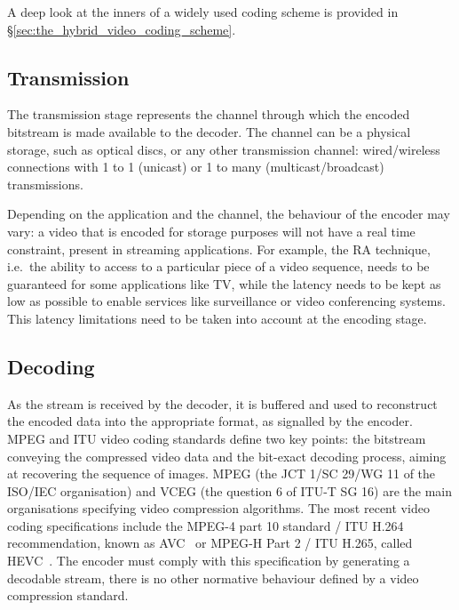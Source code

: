 \documentclass[11pt,a4paper,openright,twoside]{book}
\numberwithin{equation}{section} %
\numberwithin{figure}{section} %
\numberwithin{table}{section} %
\begin{document}
A deep look at the inners of a widely used coding scheme is provided
in \S\ref{sec:the_hybrid_video_coding_scheme}.

\subsection{Transmission}
\label{sub:transmission}

The transmission stage represents the channel through which the encoded
bitstream is made available to the decoder.
The channel can be a physical storage, such as optical discs, or any other
transmission channel: wired/wireless connections with 1 to 1 (unicast) or 1 to
many (multicast/broadcast) transmissions.

Depending on the application and the channel, the behaviour of the encoder may
vary:
a video that is encoded for storage purposes will not have a real time
constraint, present in streaming applications.
For example, the \ac{RA} technique, i.e.\ the ability to access to a
particular piece of a video sequence, needs to be guaranteed for some
applications like TV, while the latency needs to be kept as low as possible to
enable services like surveillance or video conferencing systems.
This latency limitations need to be taken into account at the encoding stage.

\subsection{Decoding}
\label{sub:decoding}

As the stream is received by the decoder, it is buffered and used to
reconstruct the encoded data into the appropriate format, as signalled
by the encoder.
\acs{MPEG} and \acs{ITU} video coding standards define two key points:
the bitstream conveying the
compressed video data and the bit-exact decoding process, aiming at recovering
the sequence of images.
\acs{MPEG} (the \acs{JCT} 1/SC 29/WG 11 of the \acs{ISO}/\acs{IEC}
organisation) and \acs{VCEG} (the question 6 of ITU-T SG 16) are the main
organisations specifying video compression algorithms.
The most recent video coding specifications include the \acs{MPEG}-4 part 10
standard / \acs{ITU} H.264 recommendation, known as \ac{AVC}~\cite{itu-03-avc}
or \acs{MPEG}-H Part 2 / \acs{ITU} H.265, called
\acf{HEVC}~\cite{itu-13-hevc}.
The encoder must comply with this specification by generating a decodable
stream, there is no other normative behaviour defined by a video compression
standard.
\end{document}
